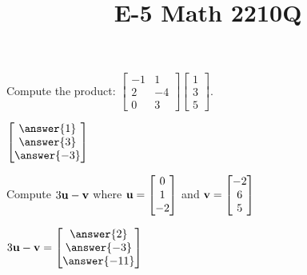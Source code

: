 \documentclass{ximera}
\newcommand{\bu}{{\bf u}}
\newcommand{\bv}{{\bf v}}
\begin{document}
  	\title{E-5  \hfill Math 2210Q} 

  	
  
 

  	 	\begin{question}
  
  	Compute the product: $	\begin{bmatrix}
  			-1 &1\\2&-4\\0 &3
  		\end{bmatrix} \begin{bmatrix}
  		1 \\3\\5
  		\end{bmatrix}$.
  		
  		$ \begin{bmatrix}
  	\answer{1}\\\answer{3}\\\answer{-3}
  		\end{bmatrix}$
  	
  		\end{question}
  		
  		\begin{question}
  	Compute $3\bu-\bv$ where $\bu =	\begin{bmatrix}
  	0\\1\\-2
  	\end{bmatrix}$ and $\bv = \begin{bmatrix}
  	-2\\6\\5
  	\end{bmatrix}$
  	
  	$3\bu -\bv = \begin{bmatrix}
  	\answer{2}\\\answer{-3}\\\answer{-11}
  	\end{bmatrix}$
  		
  	\end{question}
  	
\end{document}
